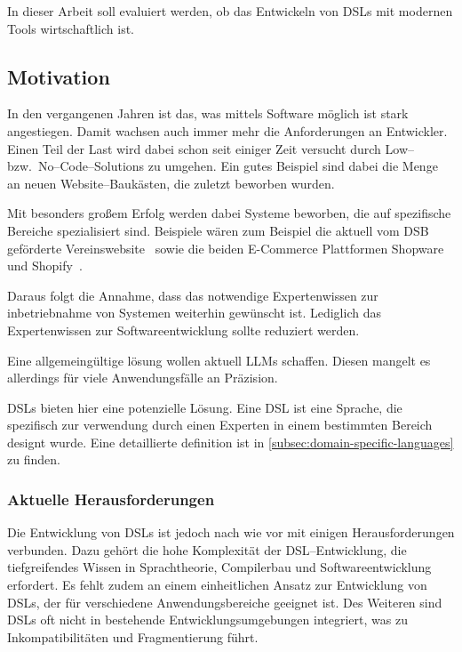In dieser Arbeit soll evaluiert werden, ob das Entwickeln von \acp{DSL} mit modernen Tools wirtschaftlich ist.

\subsection{Motivation}\label{subsec:motivation}
In den vergangenen Jahren ist das, was mittels Software möglich ist stark angestiegen.
Damit wachsen auch immer mehr die Anforderungen an Entwickler.
Einen Teil der Last wird dabei schon seit einiger Zeit versucht durch Low-- bzw.\ No--Code--Solutions zu umgehen.
Ein gutes Beispiel sind dabei die Menge an neuen Website--Baukästen, die zuletzt beworben wurden. \autocite{p-2024}

Mit besonders großem Erfolg werden dabei Systeme beworben, die auf spezifische Bereiche spezialisiert sind.
Beispiele wären zum Beispiel die aktuell vom DSB geförderte Vereinswebsite~\autocite{deutscher-olympischer-sportbund-ev-no-date} sowie die beiden E-Commerce Plattformen Shopware~\autocite{shopware-ag-no-date} und Shopify~\autocite{shopify-international-ltd-no-date}.

Daraus folgt die Annahme, dass das notwendige Expertenwissen zur inbetriebnahme von Systemen weiterhin gewünscht ist.
Lediglich das Expertenwissen zur Softwareentwicklung sollte reduziert werden.

Eine allgemeingültige lösung wollen aktuell \acp{LLM} schaffen.
Diesen mangelt es allerdings für viele Anwendungsfälle an Präzision.

\acp{DSL} bieten hier eine potenzielle Lösung.
Eine \ac{DSL} ist eine Sprache, die spezifisch zur verwendung durch einen Experten in einem bestimmten Bereich designt wurde.
Eine detaillierte definition ist in \autoref{subsec:domain-specific-languages} zu finden.

\subsubsection{Aktuelle Herausforderungen}
Die Entwicklung von \acp{DSL} ist jedoch nach wie vor mit einigen Herausforderungen verbunden.
Dazu gehört die hohe Komplexität der \acs{DSL}--Entwicklung, die tiefgreifendes Wissen in Sprachtheorie, Compilerbau und Softwareentwicklung erfordert.
Es fehlt zudem an einem einheitlichen Ansatz zur Entwicklung von \acp{DSL}, der für verschiedene Anwendungsbereiche geeignet ist.
Des Weiteren sind \acp{DSL} oft nicht in bestehende Entwicklungsumgebungen integriert, was zu Inkompatibilitäten und Fragmentierung führt.


